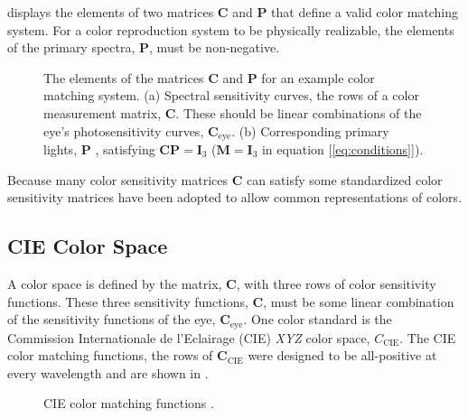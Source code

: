 
\Fig{\ref{fig:exampleColor}} displays  the elements of two matrices $\mathbf{C}$ and $\mathbf{P}$ that define a valid color matching system.  For a color reproduction system to be physically realizable, the elements of the primary spectra, $\mathbf{P}$, must be non-negative.




\begin{figure}[t]
\centerline{
}
\caption{The elements of the matrices $\mathbf{C}$ and $\mathbf{P}$ for an example color matching system.  (a) Spectral sensitivity curves, the rows of a color measurement matrix, $\mathbf{C}$. These should be linear combinations of the eye's photosensitivity curves, $\mathbf{C}_{\mbox{eye}}$.
(b) Corresponding primary lights, $\mathbf{P}$ \cite{Acdx2009},  satisfying $\mathbf{C} \mathbf{P}= \mathbf{I}_3$ ($\mathbf{M} = \mathbf{I}_3$  in equation [\ref{eq:conditions}]).}
\label{fig:exampleColor}
\end{figure}

Because many color sensitivity matrices $\mathbf{C}$ can satisfy \eqn{\ref{eq:conditionsA}} some standardized color sensitivity matrices have been adopted to allow common representations of colors. 


\subsection{CIE Color Space}

A color space is defined by the matrix, $\mathbf{C}$, with three rows
of color sensitivity functions.  These three sensitivity functions, $\mathbf{C}$, must be some linear combination of the sensitivity functions of the eye, $\mathbf{C}_{\mbox{eye}}$.
One color standard is the Commission Internationale de l'Eclairage (CIE) {\em XYZ} color space, $C_{\mbox{CIE}}$.  The CIE color matching functions, the rows of $\mathbf{C}_{\mbox{CIE}}$
were designed to be all-positive at every wavelength and are shown
in \fig{\ref{fig:ciecie}}.  


\begin{figure}[t]
\centerline{
{}}
\caption{CIE color matching functions \cite{cie1931}.}
\label{fig:ciecie}
\end{figure}


